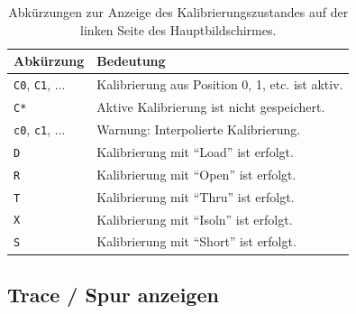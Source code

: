 \documentclass[twoside,a4paper,11pt,halfparskip,DIV=11,notitlepage]{scrartcl}
\begin{document}
\begin{table}
    \begin{center}
        \caption{Abkürzungen zur Anzeige des Kalibrierungszustandes auf der linken Seite des
        Hauptbildschirmes.}
        \label{tab:calibration}
        \begin{tabular}{ll}\toprule
            \textbf{Abkürzung} & \textbf{Bedeutung}\\\midrule
            \texttt{C0}, \texttt{C1}, ... & Kalibrierung aus Position 0, 1, etc. ist aktiv.\\
            \texttt{C*} & Aktive Kalibrierung ist nicht gespeichert.\\
            \texttt{c0}, \texttt{c1}, ... & Warnung: Interpolierte Kalibrierung.\\
            \texttt{D} & Kalibrierung mit ``Load'' ist erfolgt.\\
            \texttt{R} & Kalibrierung mit ``Open'' ist erfolgt.\\
            \texttt{T} & Kalibrierung mit ``Thru'' ist erfolgt.\\
            \texttt{X} & Kalibrierung mit ``Isoln'' ist erfolgt.\\
            \texttt{S} & Kalibrierung mit ``Short'' ist erfolgt.\\
            \bottomrule
        \end{tabular}
    \end{center}
\end{table}

\subsection{Trace / Spur anzeigen}\label{sec:nanovnatraces}
\begin{center}\end{center}
\end{document}
